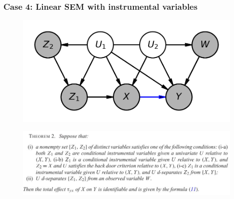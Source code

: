\documentclass{beamer}
\begin{document}
\begin{frame}
\frametitle{Case 4: Linear SEM with instrumental variables}

    \begin{figure}
    	\centering
    	\includegraphics[scale=0.6]{scripts/instrumental_var.png}
    \end{figure}

    \begin{figure}
    	\centering
    	\includegraphics[scale=0.6]{scripts/theorem.png}
    \end{figure}



\end{frame}
\end{document}
